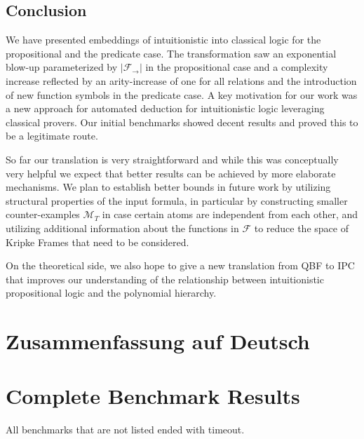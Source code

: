 \documentclass[a4paper,11pt]{report}
\theoremstyle{definition}
\theoremstyle{definition}
\theoremstyle{definition}
\theoremstyle{definition}
\theoremstyle{definition}
\theoremstyle{definition}
\theoremstyle{definition}
\begin{document}
\section{Conclusion}

	We have presented embeddings of intuitionistic into classical logic for the propositional and the predicate case.
	The transformation saw an exponential blow-up parameterized by $|\mathcal F_\to|$ in the propositional case and a complexity increase reflected by an arity-increase of one for all relations and the introduction of new function symbols in the predicate case.
	A key motivation for our work was a new approach for automated deduction for intuitionistic logic leveraging classical provers.
	Our initial benchmarks showed decent results and proved this to be a legitimate route.
	
	So far our translation is very straightforward and while this was conceptually very helpful we expect that better results can be achieved by more elaborate mechanisms.	We plan to establish better bounds in future work by utilizing structural properties of the input formula, in particular by constructing smaller counter-examples $\mathcal M_T$ in case certain atoms are independent from each other, and utilizing additional information about the functions in $\mathcal F$ to reduce the space of Kripke Frames that need to be considered.
	
	On the theoretical side, we also hope to give a new translation from QBF to IPC that improves our understanding of the relationship between intuitionistic propositional logic and the polynomial hierarchy.
	
	

	\appendix
	\chapter{Zusammenfassung auf Deutsch}
	
	\chapter{Complete Benchmark Results}\label{benchmark-results}
	\singlespacing
	All benchmarks that are not listed ended with timeout.\\
	
\end{document}
